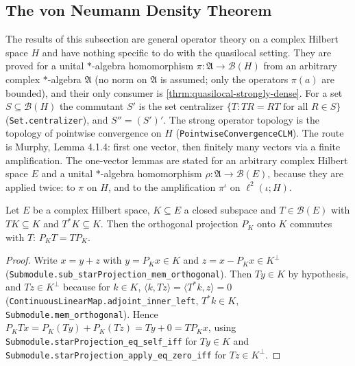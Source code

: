 \subsection{The von Neumann Density Theorem}

The results of this subsection are general operator theory on a complex Hilbert space $H$ and have nothing specific to do with the quasilocal setting. They are proved for a unital $*$-algebra homomorphism $\pi : \mathfrak{A} \to \mathcal{B}(H)$ from an arbitrary complex $*$-algebra $\mathfrak{A}$ (no norm on $\mathfrak{A}$ is assumed; only the operators $\pi(a)$ are bounded), and their only consumer is \ref{thrm:quasilocal-strongly-dense}. For a set $S \subseteq \mathcal{B}(H)$ the commutant $S'$ is the set centralizer $\{T : TR = RT \text{ for all } R \in S\}$ (\texttt{Set.centralizer}), and $S'' = (S')'$. The strong operator topology is the topology of pointwise convergence on $H$ (\texttt{PointwiseConvergenceCLM}). The route is Murphy, Lemma 4.1.4: first one vector, then finitely many vectors via a finite amplification. The one-vector lemmas are stated for an arbitrary complex Hilbert space $E$ and a unital $*$-algebra homomorphism $\rho : \mathfrak{A} \to \mathcal{B}(E)$, because they are applied twice: to $\pi$ on $H$, and to the amplification $\pi^\iota$ on $\ell^2(\iota; H)$.

\begin{lemma}
    \label{lmm:reducing-subspace-projection-commutes}
    \leanok
    Let $E$ be a complex Hilbert space, $K \subseteq E$ a closed subspace and $T \in \mathcal{B}(E)$ with $T K \subseteq K$ and $T^* K \subseteq K$. Then the orthogonal projection $P_K$ onto $K$ commutes with $T$: $P_K T = T P_K$.
\end{lemma}
\begin{proof}
    \leanok
    Write $x = y + z$ with $y = P_K x \in K$ and $z = x - P_K x \in K^\perp$ (\texttt{Submodule.sub\_starProjection\_mem\_orthogonal}). Then $Ty \in K$ by hypothesis, and $Tz \in K^\perp$ because for $k \in K$, $\langle k, Tz \rangle = \langle T^* k, z \rangle = 0$ (\texttt{ContinuousLinearMap.adjoint\_inner\_left}, $T^*k \in K$, \texttt{Submodule.mem\_orthogonal}). Hence $P_K T x = P_K(Ty) + P_K(Tz) = Ty + 0 = T P_K x$, using \texttt{Submodule.starProjection\_eq\_self\_iff} for $Ty \in K$ and \texttt{Submodule.starProjection\_apply\_eq\_zero\_iff} for $Tz \in K^\perp$.
\end{proof}

